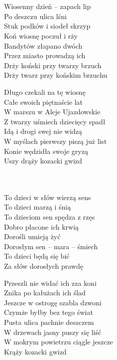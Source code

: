 \begin{text}
    \chordfill\\
    \chordfill\\
    Wiosenny dzień – zapach lip\\
    Po deszczu ulica lśni\\
    Stuk podków i siodeł skrzyp\\
    Koń wiosnę poczuł i rży\\
    Bandytów złapano dwóch\\
    Przez miasto prowadzą ich\\
    Drży koński przy twarzy brzuch\\
    Drży twarz przy końskim brzuchu

    Długo czekali na tę wiosnę\\
    Całe swoich piętnaście lat\\
    W marszu w Aleje Ujazdowskie\\
    Z twarzy uśmiech dziecięcy spadł\\
    Idą i drogi swej nie widzą\\
    W myślach pierwszy piszą już list\\
    Konie wędzidła swoje gryzą\\
    Uszy drąży kozacki gwizd

    \chordfill\\
    \chordfill\\
    To dzieci w słów wierzą sens\\
    To dzieci marzą i śnią\\
    To dzieciom sen spędza z rzęs\\
    Dobro płacone ich krwią\\
    Dorośli umieją żyć\\
    Dorosłym sen – mara – śmiech\\
    To dzieci będą się bić\\
    Za słów dorosłych prawdę

    Przeszli nie widać ich zza koni\\
    Znika po kałużach ich ślad\\
    Jeszcze w ostrogę szabla dzwoni\\
    Czymże byłby bez tego świat\\
    Pusta ulica pachnie deszczem\\
    W drzewach jasny puszy się liść\\
    W mokrym powietrzu ciągle jeszcze\\
    Krąży kozacki gwizd
\end{text}
